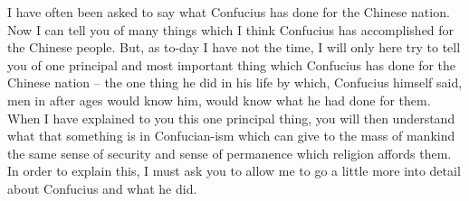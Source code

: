 I have often been asked to say what Confucius has done for the Chinese nation. Now I can tell you of many things which I think Confucius has accomplished for the Chinese people. But, as to-day I have not the time, I will only here try to tell you of one principal and most important thing which Confucius has done for the Chinese nation -- the one thing he did in his life by which, Confucius himself said, men in after ages would know him, would know what he had done for them. When I have explained to you this one principal thing, you will then understand what that something is in Confucian-ism which can give to the mass of mankind the same sense of security and sense of permanence which religion affords them. In order to explain this, I must ask you to allow me to go a little more into detail about Confucius and what he did.

